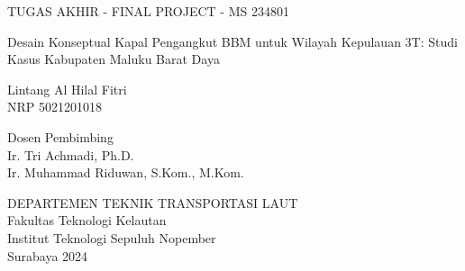 TUGAS AKHIR - FINAL PROJECT - MS 234801

\vspace{6ex}

\begin{large}
  Desain Konseptual Kapal Pengangkut BBM untuk Wilayah Kepulauan 3T:  Studi Kasus Kabupaten Maluku Barat Daya
\end{large}

\vspace{4ex}

Lintang Al Hilal Fitri \\
NRP 5021201018

\vspace{2ex}

Dosen Pembimbing \\
Ir. Tri Achmadi, Ph.D.\\
Ir. Muhammad Riduwan, S.Kom., M.Kom. 
\vspace{6ex}

DEPARTEMEN TEKNIK TRANSPORTASI LAUT \\
Fakultas Teknologi Kelautan \\
Institut Teknologi Sepuluh Nopember \\
Surabaya 2024
